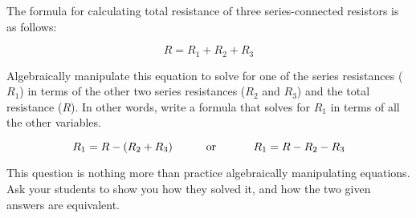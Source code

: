 

The formula for calculating total resistance of three series-connected resistors is as follows:

$$R = R_1 + R_2 + R_3$$

Algebraically manipulate this equation to solve for one of the series resistances ($R_1$) in terms of the other two series resistances ($R_2$ and $R_3$) and the total resistance ($R$).  In other words, write a formula that solves for $R_1$ in terms of all the other variables.







$$R_1 = R - (R_2 + R_3) \hbox{\hskip 30pt or \hskip 30pt} R_1 = R - R_2 - R_3$$







This question is nothing more than practice algebraically manipulating equations.  Ask your students to show you how they solved it, and how the two given answers are equivalent.




